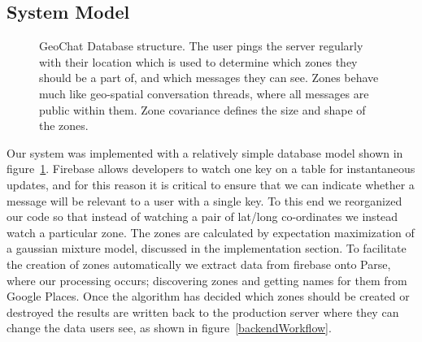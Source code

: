 
\subsection{System Model}
\begin{figure}
\caption{GeoChat Database structure.  The user pings the server regularly with their location which is used to determine which zones they should be a part of, and which messages they can see.  Zones behave much like geo-spatial conversation threads, where all messages are public within them.  Zone covariance defines the size and shape of the zones.}
\label{systemModel}
\end{figure}

Our system was implemented with a relatively simple database model shown in figure~\ref{systemModel}.  Firebase allows developers to watch one key on a table for instantaneous updates, and for this reason it is critical to ensure that we can indicate whether a message will be relevant to a user with a single key.  To this end we reorganized our code so that instead of watching a pair of lat/long co-ordinates we instead watch a particular zone.  The zones are calculated by expectation maximization of a gaussian mixture model, discussed in the implementation section.  To facilitate the creation of zones automatically we extract data from firebase onto Parse, where our processing occurs;  discovering zones and getting names for them from Google Places.  Once the algorithm has decided which zones should be created or destroyed the results are written back to the production server where they can change the data users see, as shown in figure~\ref{backendWorkflow}.


